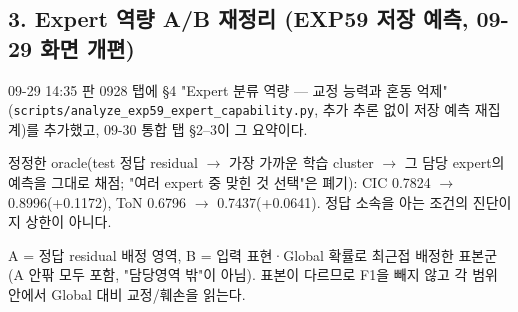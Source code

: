 \subsection{3. Expert 역량 A/\allowbreak{}B 재정리 (EXP59 저장 예측, 09-29 화면 개편)}
09-29 14:35 판 0928 탭에 §4 "Expert 분류 역량 — 교정 능력과 혼동 억제"(\texttt{scripts/\allowbreak{}\allowbreak{}analyze\_\allowbreak{}\allowbreak{}exp59\_\allowbreak{}\allowbreak{}ex\allowbreak{}pert\_\allowbreak{}\allowbreak{}cap\allowbreak{}ability.\allowbreak{}py}, 추가 추론 없이 저장 예측 재집계)를 추가했고, 09-30 통합 탭 §2–3이 그 요약이다.

\par\noindent \textbullet\enspace 정정한 oracle(test 정답 residual  \ensuremath{\rightarrow}  가장 가까운 학습 cluster  \ensuremath{\rightarrow}  그 담당 expert의 예측을 그대로 채점; "여러 expert 중 맞힌 것 선택"은 폐기): CIC 0.7824 \ensuremath{\rightarrow} 0.8996(+\allowbreak{}0.1172), ToN 0.6796 \ensuremath{\rightarrow} 0.7437(+\allowbreak{}0.0641). 정답 소속을 아는 조건의 진단이지 상한이 아니다.


\par\noindent \textbullet\enspace A =\allowbreak{} 정답 residual 배정 영역, B =\allowbreak{} 입력 표현·Global 확률로 최근접 배정한 표본군(A 안팎 모두 포함, "담당영역 밖"이 아님). 표본이 다르므로 F1을 빼지 않고 각 범위 안에서 Global 대비 교정/\allowbreak{}훼손을 읽는다.


